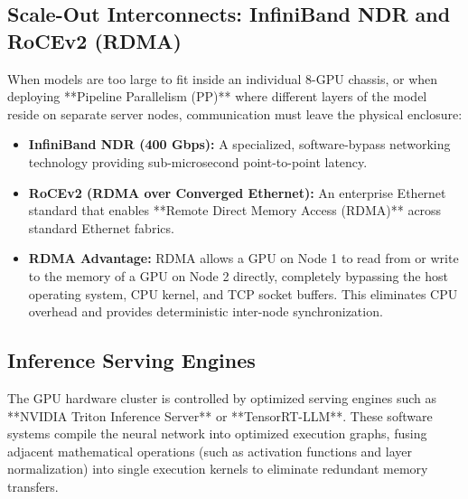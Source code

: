 \documentclass[12pt,a4paper]{report}
\begin{document}
\subsection{Scale-Out Interconnects: InfiniBand NDR and RoCEv2 (RDMA)}
When models are too large to fit inside an individual 8-GPU chassis, or when deploying **Pipeline Parallelism (PP)** where different layers of the model reside on separate server nodes, communication must leave the physical enclosure:
\begin{itemize}[leftmargin=1.2cm]
    \item \textbf{InfiniBand NDR (400 Gbps):} A specialized, software-bypass networking technology providing sub-microsecond point-to-point latency.
    \item \textbf{RoCEv2 (RDMA over Converged Ethernet):} An enterprise Ethernet standard that enables **Remote Direct Memory Access (RDMA)** across standard Ethernet fabrics.
    \item \textbf{RDMA Advantage:} RDMA allows a GPU on Node 1 to read from or write to the memory of a GPU on Node 2 directly, completely bypassing the host operating system, CPU kernel, and TCP socket buffers. This eliminates CPU overhead and provides deterministic inter-node synchronization.
\end{itemize}

\subsection{Inference Serving Engines}
The GPU hardware cluster is controlled by optimized serving engines such as **NVIDIA Triton Inference Server** or **TensorRT-LLM**. These software systems compile the neural network into optimized execution graphs, fusing adjacent mathematical operations (such as activation functions and layer normalization) into single execution kernels to eliminate redundant memory transfers.
\end{document}
